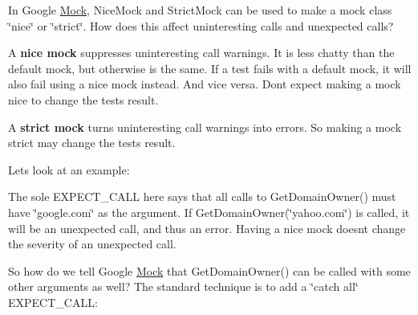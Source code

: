 In Google \mbox{\hyperlink{class_mock}{Mock}}, {\ttfamily Nice\+Mock} and {\ttfamily Strict\+Mock} can be used to make a mock class \char`\"{}nice\char`\"{} or \char`\"{}strict\char`\"{}. How does this affect uninteresting calls and unexpected calls?

A {\bfseries{nice mock}} suppresses uninteresting call warnings. It is less chatty than the default mock, but otherwise is the same. If a test fails with a default mock, it will also fail using a nice mock instead. And vice versa. Don\textquotesingle{}t expect making a mock nice to change the test\textquotesingle{}s result.

A {\bfseries{strict mock}} turns uninteresting call warnings into errors. So making a mock strict may change the test\textquotesingle{}s result.

Let\textquotesingle{}s look at an example\+:


\begin{DoxyCode}{0}
\DoxyCodeLine{}
\DoxyCodeLine{\}}
\end{DoxyCode}


The sole {\ttfamily E\+X\+P\+E\+C\+T\+\_\+\+C\+A\+LL} here says that all calls to {\ttfamily Get\+Domain\+Owner()} must have {\ttfamily \char`\"{}google.\+com\char`\"{}} as the argument. If {\ttfamily Get\+Domain\+Owner(\char`\"{}yahoo.\+com\char`\"{})} is called, it will be an unexpected call, and thus an error. Having a nice mock doesn\textquotesingle{}t change the severity of an unexpected call.

So how do we tell Google \mbox{\hyperlink{class_mock}{Mock}} that {\ttfamily Get\+Domain\+Owner()} can be called with some other arguments as well? The standard technique is to add a \char`\"{}catch all\char`\"{} {\ttfamily E\+X\+P\+E\+C\+T\+\_\+\+C\+A\+LL}\+:


\begin{DoxyCode}{0}
\end{DoxyCode}


